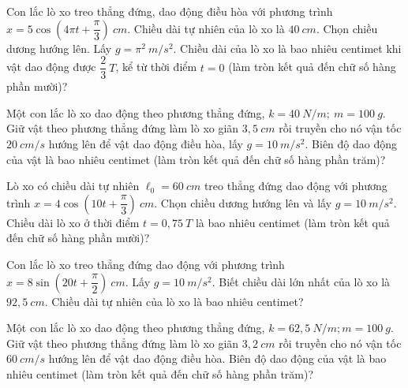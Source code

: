 \PhanIII 
\setcounter{ex}{0}

\begin{ex}
Con lắc lò xo treo thẳng đứng, dao động điều hòa với phương trình $x=5 \cos \left(4 \pi t+\dfrac{\pi}{3}\right)\ cm$. Chiều dài tự nhiên của lò xo là $40 \ cm$. Chọn chiều dương hướng lên. Lấy $g=\pi^2 \ m/s^2$. Chiều dài của lò xo là bao nhiêu centimet khi vật dao động được $\dfrac{2}{3} \ T$, kể từ thời điểm $t=0$ (làm tròn kết quả đến chữ số hàng phần mười)?
\end{ex} 

\begin{ex}
Một con lắc lò xo dao động theo phương thẳng đứng, $k=40 \ N/m;\ m=100 \ g$. Giữ vật theo phương thẳng đứng làm lò xo giãn $3,5 \ cm$ rồi truyền cho nó vận tốc $20 \ cm/s$ hướng lên để vật dao động điều hòa, lấy $g=10 \ m/s^2$. Biên độ dao động của vật là bao nhiêu centimet (làm tròn kết quả đến chữ số hàng phần trăm)?
\end{ex} 
\begin{ex}
Lò xo có chiều dài tự nhiên $\ell_0=60 \ cm$ treo thẳng đứng dao động với phương trình $x=4 \cos \left(10 t+\dfrac{\pi}{3}\right)\ cm$. Chọn chiều dương hướng lên và lấy $g=10 \ m/s^2$. Chiều dài lò xo ở thời điểm $t=0,75 \ T$ là bao nhiêu centimet (làm tròn kết quả đến chữ số hàng phần mười)?
\end{ex} 
\begin{ex}
Con lắc lò xo treo thẳng đứng dao động với phương trình $x=8 \sin \left(20 t+\dfrac{\pi}{2}\right)\ cm$. Lấy $g=10 \ m/s^2$. Biết chiều dài lớn nhất của lò xo là $92,5 \ cm$. Chiều dài tự nhiên của lò xo là bao nhiêu centimet?
\end{ex} 
\begin{ex}
Một con lắc lò xo dao động theo phương thẳng đứng, $k=62,5 \ N/m; m=100 \ g$. Giữ vật theo phương thẳng đứng làm lò xo giãn $3,2 \ cm$ rồi truyền cho nó vận tốc $60 \ cm/s$ hướng lên để vật dao động điều hòa. Biên độ dao động của vật là bao nhiêu centimet (làm tròn kết quả đến chữ số hàng phần trăm)?
\end{ex} 
